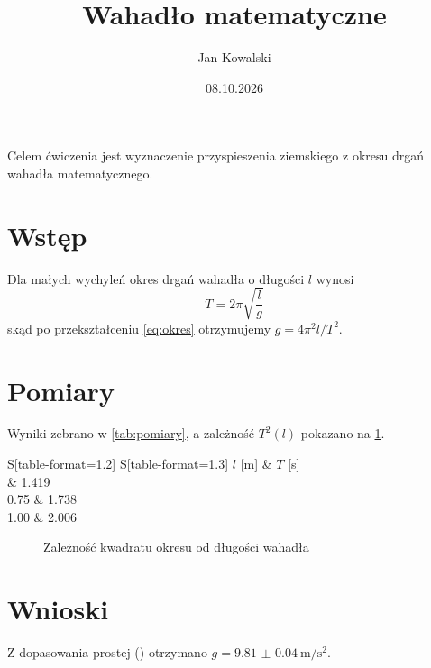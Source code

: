 \documentclass[a4paper, polish, 11pt]{scrartcl}
\title{Wahadło matematyczne}
\author{Jan Kowalski}
\date{08.10.2026}
\begin{document}
\maketitle

\begin{preface}
Celem ćwiczenia jest wyznaczenie przyspieszenia ziemskiego z okresu
drgań wahadła matematycznego.
\end{preface}

\begincolumns

\section{Wstęp}\label{sec:wstep}
Dla małych wychyleń okres drgań wahadła o długości $l$ wynosi
\begin{equation}
	T = 2\pi\sqrt{\frac{l}{g}}
	\label{eq:okres}
\end{equation}
skąd po przekształceniu \cref{eq:okres} otrzymujemy $g = 4\pi^2 l / T^2$.

\section{Pomiary}\label{sec:pomiary}
Wyniki zebrano w \cref{tab:pomiary}, a zależność $T^2(l)$ pokazano
na \cref{fig:wykres}.

\begin{table}
	\centering
	\caption{Okres drgań dla różnych długości wahadła}
	\label{tab:pomiary}
	\begin{tabular}{S[table-format=1.2] S[table-format=1.3]}
		\toprule
		{$l$ [\si{\metre}]} & {$T$ [\si{\second}]} \\
		 & 1.419 \\
		0.75 & 1.738 \\
		1.00 & 2.006 \\
		\bottomrule
	\end{tabular}
\end{table}

\begin{figure}
	\centering
	\caption{Zależność kwadratu okresu od długości wahadła}
	\label{fig:wykres}
\end{figure}

\section{Wnioski}
Z dopasowania prostej () otrzymano
$g = \qty{9.81(4)}{\metre\per\second\squared}$.
\end{document}
